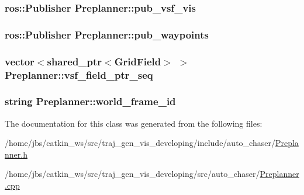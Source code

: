 \subsubsection[{\texorpdfstring{pub\+\_\+vsf\+\_\+vis}{pub_vsf_vis}}]{\setlength{\rightskip}{0pt plus 5cm}ros\+::\+Publisher Preplanner\+::pub\+\_\+vsf\+\_\+vis\hspace{0.3cm}{\ttfamily [private]}}\hypertarget{class_preplanner_a8dafcd99dc50e89404c4f33a688eba6c}{}\label{class_preplanner_a8dafcd99dc50e89404c4f33a688eba6c}
\subsubsection[{\texorpdfstring{pub\+\_\+waypoints}{pub_waypoints}}]{\setlength{\rightskip}{0pt plus 5cm}ros\+::\+Publisher Preplanner\+::pub\+\_\+waypoints\hspace{0.3cm}{\ttfamily [private]}}\hypertarget{class_preplanner_a87dc12e474ee43c9e2b095ec64ab08ce}{}\label{class_preplanner_a87dc12e474ee43c9e2b095ec64ab08ce}
\subsubsection[{\texorpdfstring{vsf\+\_\+field\+\_\+ptr\+\_\+seq}{vsf_field_ptr_seq}}]{\setlength{\rightskip}{0pt plus 5cm}vector$<$shared\+\_\+ptr$<${\bf Grid\+Field}$>$ $>$ Preplanner\+::vsf\+\_\+field\+\_\+ptr\+\_\+seq\hspace{0.3cm}{\ttfamily [private]}}\hypertarget{class_preplanner_aab0f91e34b86eaa581c7642ba5059308}{}\label{class_preplanner_aab0f91e34b86eaa581c7642ba5059308}
\subsubsection[{\texorpdfstring{world\+\_\+frame\+\_\+id}{world_frame_id}}]{\setlength{\rightskip}{0pt plus 5cm}string Preplanner\+::world\+\_\+frame\+\_\+id\hspace{0.3cm}{\ttfamily [private]}}\hypertarget{class_preplanner_a08cb79c25bd4ded139a572672e4492cd}{}\label{class_preplanner_a08cb79c25bd4ded139a572672e4492cd}


The documentation for this class was generated from the following files\+:\begin{DoxyCompactItemize}
\item 
/home/jbs/catkin\+\_\+ws/src/traj\+\_\+gen\+\_\+vis\+\_\+developing/include/auto\+\_\+chaser/\hyperlink{_preplanner_8h}{Preplanner.\+h}\item 
/home/jbs/catkin\+\_\+ws/src/traj\+\_\+gen\+\_\+vis\+\_\+developing/src/auto\+\_\+chaser/\hyperlink{_preplanner_8cpp}{Preplanner.\+cpp}\end{DoxyCompactItemize}

